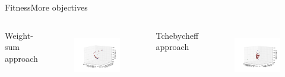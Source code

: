 \begin{frame}{Fitness}{More objectives}
\begin{columns}
	{ Weight-sum approach}
	\begin{figure}
		\centering
		\includegraphics[width=\linewidth]{figure/sim6-3obj/PF06-MORRT.png}
		\label{fig:sim:03:fit1}
	\end{figure}
	{ Tchebycheff approach}
	\begin{figure}
		\centering
		\includegraphics[width=\linewidth]{figure/sim7-3obj/PF07-MORRT2.png}
		\label{fig:sim:03:fit2}
	\end{figure}
\end{columns}
\end{frame}
